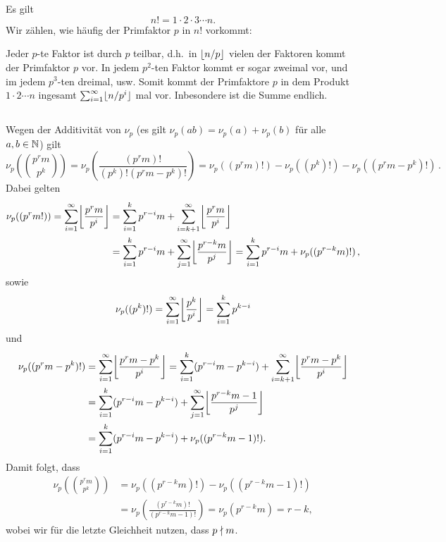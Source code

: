 \section{}





\subsection{}

Es gilt
\[
    n!
  = 1 \cdot 2 \cdot 3 \dotsm n.
\]
Wir zählen, wie häufig der Primfaktor $p$ in $n!$ vorkommt:

Jeder $p$-te Faktor ist durch $p$ teilbar, d.h.\ in $\lfloor n/p\rfloor$ vielen der Faktoren kommt der Primfaktor $p$ vor.
In jedem $p^2$-ten Faktor kommt er sogar zweimal vor, und im jedem $p^3$-ten dreimal, usw.
Somit kommt der Primfaktore $p$ in dem Produkt $1 \cdot 2 \dotsm n$ ingesamt $\sum_{i=1}^\infty \lfloor n/p^i\rfloor$ mal vor.
Inbesondere ist die Summe endlich.





\subsection{}

Wegen der Additivität von $\nu_p$ (es gilt $\nu_p(ab) = \nu_p(a) + \nu_p(b)$ für alle $a,b \in \mathbb{N}$) gilt
\[
    \nu_p\left( \binom{p^r m}{p^k} \right)
  = \nu_p\left( \frac{(p^r m)!}{(p^k)! (p^r m - p^k)!} \right)
  = \nu_p((p^r m)!) - \nu_p((p^k)!) - \nu_p((p^r m - p^k)!)\,.
\]
Dabei gelten
\begin{align*}
      \nu_p( (p^r m!) )
  =   \sum_{i=1}^\infty \floor*{ \frac{p^r m}{p^i} }
  &=  \sum_{i=1}^k p^{r-i} m + \sum_{i={k+1}}^\infty \floor*{ \frac{p^r m}{p^i} }
  \\
  &=  \sum_{i=1}^k p^{r-i} m + \sum_{j=1}^\infty \floor*{ \frac{p^{r-k} m}{p^j} }
   =  \sum_{i=1}^k p^{r-i} m + \nu_p( (p^{r-k} m)! )\,,
\end{align*}
sowie
\[
    \nu_p( (p^k)! )
  = \sum_{i=1}^\infty \floor*{ \frac{p^k}{p^i} }
  = \sum_{i=1}^k p^{k-i}
\]
und
\begin{align*}
    \nu_p( (p^r m - p^k)! )
  &= \sum_{i=1}^\infty \floor*{ \frac{p^r m - p^k}{p^i} }
   = \sum_{i=1}^k (p^{r-i} m - p^{k-i}) + \sum_{i=k+1}^\infty \floor*{ \frac{p^r m - p^k}{p^i} }
  \\
  &= \sum_{i=1}^k (p^{r-i} m - p^{k-i}) + \sum_{j=1}^\infty \floor*{ \frac{p^{r-k} m - 1}{p^j} }
  \\
  &= \sum_{i=1}^k (p^{r-i} m - p^{k-i}) + \nu_p((p^{r-k} m - 1)!).
\end{align*}
Damit folgt, dass
\begin{align*}
      \nu_p\left( \binom{p^r m}{p^k} \right)
  &=  \nu_p( (p^{r-k} m)! ) - \nu_p( (p^{r-k} m - 1)! )
  \\
  &=  \nu_p\left( \frac{(p^{r-k} m)!}{(p^{r-k} m - 1)!} \right)
   =  \nu_p( p^{r-k} m )
   =  r-k,
\end{align*}
wobei wir für die letzte Gleichheit nutzen, dass $p \mathrel{\nmid} m$.





